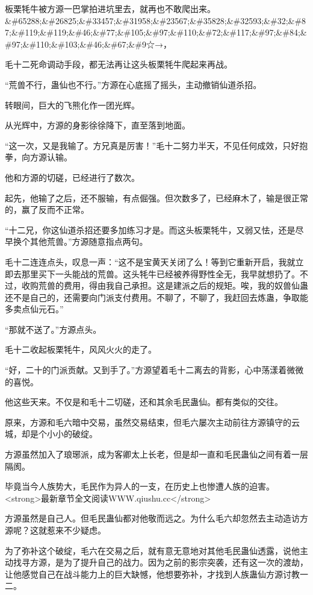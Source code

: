 
\begin{this_body}

板栗牦牛被方源一巴掌拍进坑里去，就再也不敢爬出来。\&\#65288;\&\#26825;\&\#33457;\&\#31958;\&\#23567;\&\#35828;\&\#32593;\&\#32;\&\#87;\&\#119;\&\#119;\&\#46;\&\#77;\&\#105;\&\#97;\&\#110;\&\#72;\&\#117;\&\#97;\&\#84;\&\#97;\&\#110;\&\#103;\&\#46;\&\#67;\&\#9☆→，

毛十二死命调动手段，都无法再让这头板栗牦牛爬起来再战。

“荒兽不行，蛊仙也不行。”方源在心底摇了摇头，主动撤销仙道杀招。

转眼间，巨大的飞熊化作一团光辉。

从光辉中，方源的身影徐徐降下，直至落到地面。

“这一次，又是我输了。方兄真是厉害！”毛十二努力半天，不见任何成效，只好抱拳，向方源认输。

他和方源的切磋，已经进行了数次。

起先，他输了之后，还不服输，有点倔强。但次数多了，已经麻木了，输是很正常的，赢了反而不正常。

“十二兄，你这仙道杀招还要多加练习才是。而这头板栗牦牛，又弱又怯，还是尽早换个其他荒兽。”方源随意指点两句。

毛十二连连点头，叹息一声：“这不是宝黄天关闭了么！等到它重新开启，我就立即去那里买下一头能战的荒兽。这头牦牛已经被养得野性全无，我早就想扔了。不过，收购荒兽的费用，得由我自己承担。这是建派之后的规矩。唉，我的奴兽仙蛊还不是自己的，还需要向门派支付费用。不聊了，不聊了，我赶回去炼蛊，争取能多卖点仙元石。”

“那就不送了。”方源点头。

毛十二收起板栗牦牛，风风火火的走了。

“好，二十的门派贡献。又到手了。”方源望着毛十二离去的背影，心中荡漾着微微的喜悦。

他这些天来。不仅是和毛十二切磋，还和其余毛民蛊仙。都有类似的交往。

原来，方源和毛六暗中交易，虽然交易结束，但毛六屡次主动前往方源镇守的云城，却是个小小的破绽。

方源虽然加入了琅琊派，成为客卿太上长老，但是却一直和毛民蛊仙之间有着一层隔阂。

毕竟当今人族势大，毛民作为异人的一支，在历史上也惨遭人族的迫害。<strong>最新章节全文阅读WWW.qiushu.cc</strong>

方源虽然是自己人。但毛民蛊仙都对他敬而远之。为什么毛六却忽然去主动造访方源呢？这就惹来不少疑虑。

为了弥补这个破绽，毛六在交易之后，就有意无意地对其他毛民蛊仙透露，说他主动找寻方源，是为了提升自己的战力。因为之前的影宗突袭，还有这一次的渡劫，让他感觉自己在战斗能力上的巨大缺憾，他想要弥补，才找到人族蛊仙方源讨教一二。


\end{this_body}
